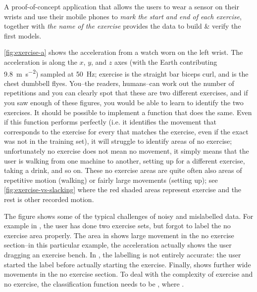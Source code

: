 A proof-of-concept application that allows the users to wear a sensor on their wrists and use their mobile phones to \emph{mark the start and end of each exercise}, together with \emph{the name of the exercise} provides the data to build \& verify the first models. 


\autoref{fig:exercise-a} shows the acceleration from a watch worn on the left wrist. The acceleration is along the $x$, $y$, and $z$ axes (with the Earth contributing \SI{9.8}{\meter\second^{-2}}) sampled at \SI{50}{\hertz}; exercise  is the straight bar biceps curl, and  is the chest dumbbell flyes. You--the readers, humans--can work out the number of repetitions and you can clearly spot that these are two different exercises, and if you saw enough of these figures, you would be able to learn to identify the two exercises. It should be possible to implement a function  that does the same. Even if this function performs perfectly (i.e. it identifies the movement that corresponds to the exercise for every  that matches the exercise, even if the exact  was not in the training set), it will struggle to identify areas of no exercise; unfortunately no exercise does not mean no movement, it simply means that the user is walking from one machine to another, setting up for a different exercise, taking a drink, and so on. These no exercise areas are quite often also areas of repetitive motion (walking) or fairly large movements (setting up); see \autoref{fig:exercise-vs-slacking} where the red shaded areas represent exercise and the rest is other recorded motion.


The figure shows some of the typical challenges of noisy and mislabelled data. For example in , the user has done two exercise sets, but forgot to label the no exercise area properly. The area in  shows large movement in the no exercise section--in this particular example, the acceleration actually shows the user dragging an exercise bench. In , the labelling is not entirely accurate: the user started the label before actually starting the exercise. Finally,  shows further wide movements in the no exercise section. To deal with the complexity of exercise and no exercise, the classification function needs to be , where . 

